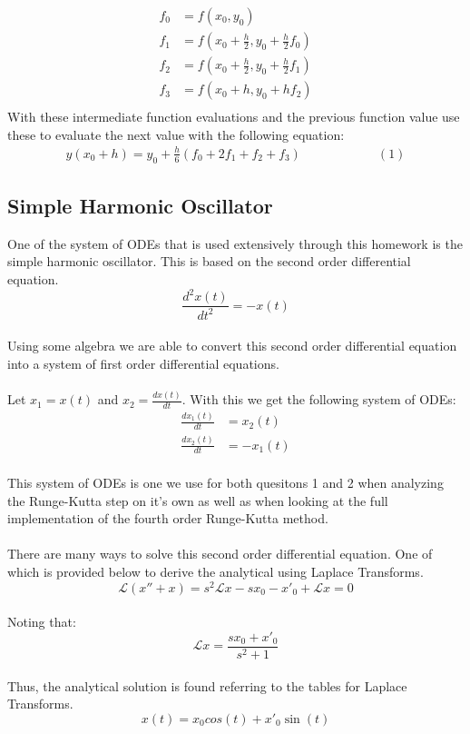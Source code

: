 \documentclass{article}
\newcommand{\Laplace}{\mathscr{L}}
\begin{document}
\begin{align*}
    f_0 &= f(x_0, y_0)\\
    f_1 &= f(x_0 + \frac{h}{2}, y_0 + \frac{h}{2}f_0)\\
    f_2 &= f(x_0 + \frac{h}{2}, y_0 + \frac{h}{2}f_1)\\
    f_3 &= f(x_0 + h, y_0 + hf_2)\\
\end{align*}
With these intermediate function evaluations and the previous function value use these to evaluate the next value with the following equation:\\
\begin{align*}
    y(x_0 + h) = y_0 + \frac{h}{6}(f_0 + 2f_1 + f_2 + f_3) \qquad\qquad\qquad (1)
\end{align*}

\subsection{Simple Harmonic Oscillator}
One of the system of ODEs that is used extensively through this homework is the simple harmonic oscillator. This is based on the second order differential equation. $$\frac{d^2 x(t)}{dt^2} = -x(t)$$\\
Using some algebra we are able to convert this second order differential equation into a system of first order differential equations. \\
\\
Let $x_1 = x(t)$ and $x_2 = \frac{dx(t)}{dt}$. With this we get the following system of ODEs:
\begin{align*}
    \frac{dx_1(t)}{dt} &= x_2(t)\\
    \frac{dx_2(t)}{dt} &= -x_1(t)
\end{align*}
\\
This system of ODEs is one we use for both quesitons 1 and 2 when analyzing the Runge-Kutta step on it's own as well as when looking at the full implementation of the fourth order Runge-Kutta method.\\
\\
There are many ways to solve this second order differential equation. One of which is provided below to derive the analytical  using Laplace Transforms. $$\Laplace(x'' + x) = s^2 \Laplace x - s x_0 - x'_0 + \Laplace x = 0$$\\
Noting that: $$\Laplace x = \frac{s x_0 + x'_0}{s^2 + 1}$$\\
Thus, the analytical solution is found referring to the tables for Laplace Transforms.$$x(t) = x_0 cos(t) + x'_0 \sin(t)$$
\end{document}
